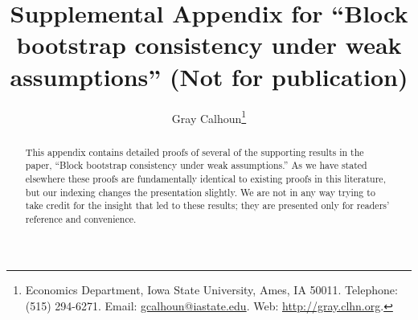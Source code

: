 \documentclass[11pt]{article}
\begin{document}
\author{Gray Calhoun\thanks{Economics Department, Iowa State
    University, Ames, IA 50011. Telephone: (515) 294-6271.  Email:
    \protect\url{gcalhoun@iastate.edu}. Web:
    \protect\url{http://gray.clhn.org}.}}

\title{Supplemental Appendix for ``Block bootstrap consistency under
  weak assumptions'' (Not for publication)}

\maketitle

\begin{abstract}
  \noindent This appendix contains detailed proofs of several of the
  supporting results in the paper, ``Block bootstrap consistency under
  weak assumptions.'' As we have stated elsewhere these proofs are
  fundamentally identical to existing proofs in this literature, but
  our indexing changes the presentation slightly. We are not in any
  way trying to take credit for the insight that led to these results;
  they are presented only for readers' reference and convenience.
\end{abstract}
\end{document}
